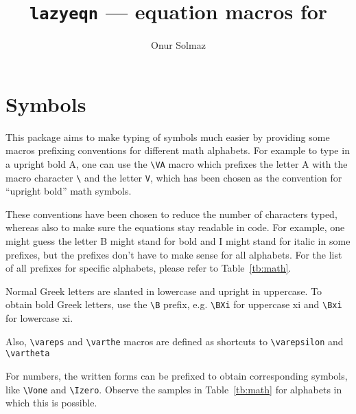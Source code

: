 \documentclass[DIV15]{scrartcl}
\title{\texttt{lazyeqn}\textnormal{ --- equation macros for \LaTeXe}}
\author{Onur Solmaz}
\begin{document}
\maketitle
\section{Symbols}

This package aims to make typing of symbols much easier by providing some macros
prefixing conventions for different math alphabets. For example to type in a
upright bold A, one can use the \verb+\VA+ macro which prefixes the letter A
with the macro character \verb+\+ and the letter \verb+V+, which has been chosen
as the convention for ``upright bold'' math symbols.

These conventions have been chosen to reduce the number of characters typed,
whereas also to make sure the equations stay readable in code. For example, one might guess
the letter B might stand for bold and I might stand for italic in some prefixes,
but the prefixes don't have to make sense for all alphabets.
For the list of all prefixes for
specific alphabets, please refer to Table~\ref{tb:math}.

Normal Greek letters are slanted in lowercase and upright in uppercase. To
obtain bold Greek letters, use the \verb+\B+ prefix, e.g. \verb+\BXi+ for
uppercase xi and \verb+\Bxi+ for lowercase xi.

Also, \verb+\vareps+ and \verb+\varthe+ macros are defined as shortcuts to \verb+\varepsilon+ and \verb+\vartheta+

For numbers, the written forms can be prefixed to obtain corresponding symbols,
like \verb+\Vone+ and \verb+\Izero+. Observe the samples in Table~\ref{tb:math}
for alphabets in which this is possible.
\end{document}
